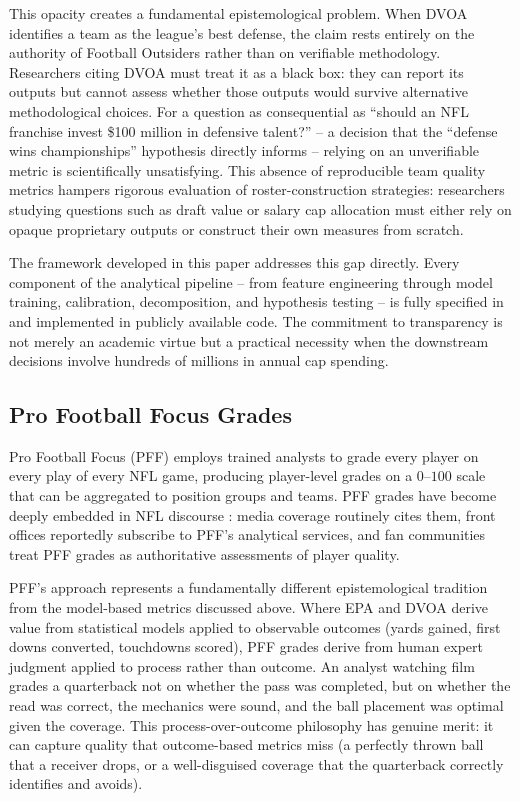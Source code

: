 This opacity creates a fundamental epistemological problem. When DVOA identifies a team as the league's best defense, the claim rests entirely on the authority of Football Outsiders rather than on verifiable methodology. Researchers citing DVOA must treat it as a black box: they can report its outputs but cannot assess whether those outputs would survive alternative methodological choices. For a question as consequential as ``should an NFL franchise invest \$100 million in defensive talent?''  -- a decision that the ``defense wins championships'' hypothesis directly informs  -- relying on an unverifiable metric is scientifically unsatisfying. This absence of reproducible team quality metrics hampers rigorous evaluation of roster-construction strategies: researchers studying questions such as draft value \parencite{massey2013loserscurse} or salary cap allocation \parencite{mulholland2019optimizing} must either rely on opaque proprietary outputs or construct their own measures from scratch.

The \gds{} framework developed in this paper addresses this gap directly. Every component of the analytical pipeline  -- from feature engineering through model training, calibration, decomposition, and hypothesis testing  -- is fully specified in  and implemented in publicly available code. The commitment to transparency is not merely an academic virtue but a practical necessity when the downstream decisions involve hundreds of millions in annual cap spending.

\subsection{Pro Football Focus Grades}
\label{sec:pff}

Pro Football Focus (PFF) employs trained analysts to grade every player on every play of every NFL game, producing player-level grades on a $0$--$100$ scale that can be aggregated to position groups and teams. PFF grades have become deeply embedded in NFL discourse \parencite{pff2014grades}: media coverage routinely cites them, front offices reportedly subscribe to PFF's analytical services, and fan communities treat PFF grades as authoritative assessments of player quality.

PFF's approach represents a fundamentally different epistemological tradition from the model-based metrics discussed above. Where EPA and DVOA derive value from statistical models applied to observable outcomes (yards gained, first downs converted, touchdowns scored), PFF grades derive from human expert judgment applied to process rather than outcome. An analyst watching film grades a quarterback not on whether the pass was completed, but on whether the read was correct, the mechanics were sound, and the ball placement was optimal given the coverage. This process-over-outcome philosophy has genuine merit: it can capture quality that outcome-based metrics miss (a perfectly thrown ball that a receiver drops, or a well-disguised coverage that the quarterback correctly identifies and avoids).


